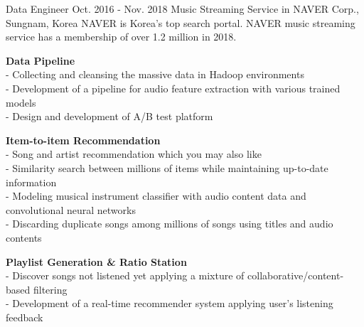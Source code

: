 \begin{cventries}
    \cventry
        {Data Engineer} %
        {Oct. 2016 - Nov. 2018} %
        {Music Streaming Service in NAVER Corp., } %
        {Sungnam, Korea}%
        { %
            NAVER is Korea's top search portal.
            NAVER music streaming service has a membership of over 1.2 million in 2018.
        }
        { %
            \begin{cvitems}
                \item {
                    {\bf Data Pipeline} \\
                    - Collecting and cleansing the massive data in Hadoop environments
                         \\
                    - Development of a pipeline for audio feature extraction with various trained models
                         \\
                    - Design and development of A/B test platform
                         \nn
                }
                \item {
                    {\bf Item-to-item Recommendation} \\
                    - Song and artist recommendation which you may also like
                         \\
                    - Similarity search between millions of items while maintaining up-to-date information
                         \\
                    - Modeling musical instrument classifier with audio content data and convolutional neural networks
                         \\
                    - Discarding duplicate songs among millions of songs using titles and audio contents
                         \nn
                }
                \item {
                    {\bf Playlist Generation \& Ratio Station} \\
                    - Discover songs not listened yet applying a mixture of collaborative/content-based filtering
                         \\
                    - Development of a real-time recommender system applying user's listening feedback
                         \nn
                }
            \end{cvitems}
        }
\end{cventries}